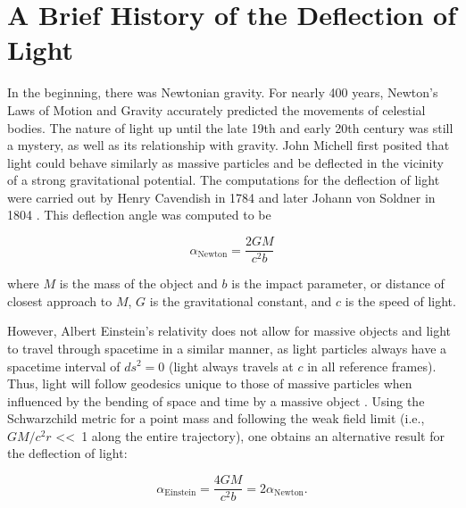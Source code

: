 \section{A Brief History of the Deflection of Light}

In the beginning, there was Newtonian gravity. For nearly 400 years, Newton's Laws of Motion and Gravity accurately predicted the movements of celestial bodies. The nature of light up until the late 19th and early 20th century was still a mystery, as well as its relationship with gravity. John Michell first posited that light could behave similarly as massive particles and be deflected in the vicinity of a strong gravitational potential. The computations for the deflection of light were carried out by Henry Cavendish in 1784 \citep{Cavendish:2011ts} and later Johann von Soldner in 1804 \citep{Jaki:1978wc}. This deflection angle was computed to be

\begin{equation}
\alpha_\mathrm{Newton} = \frac{2GM}{c^2b}
\end{equation}

\noindent where $M$ is the mass of the object and $b$ is the impact parameter, or distance of closest approach to $M$, $G$ is the gravitational constant, and $c$ is the speed of light.

However, Albert Einstein's relativity does not allow for massive objects and light to travel through spacetime in a similar manner, as light particles always have a spacetime interval of $ds^2=0$ (light always travels at $c$ in all reference frames). Thus, light will follow geodesics unique to those of massive particles when influenced by the bending of space and time by a massive object \citep{Einstein:1911rf}. Using the Schwarzchild metric for a point mass and following the weak field limit (i.e., $GM/c^2r$ \textless \textless\ 1 along the entire trajectory), one obtains an alternative result for the deflection of light:

\begin{equation}
\alpha_\mathrm{Einstein} = \frac{4GM}{c^2b} =  2\alpha_\mathrm{Newton}.
\label{intro:eqn:deflection}
\end{equation}

